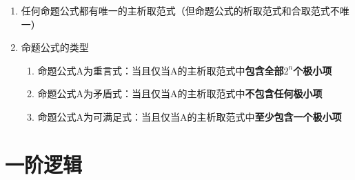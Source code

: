 \documentclass{ctexart}
\numberwithin{figure}{section}
\numberwithin{equation}{section}
\numberwithin{table}{section}
\begin{document}
\begin{enumerate}
                例如，对于两个命题变元 $p$ 和 $q$，其极大项共有 $2^2=4$ 个，分别为：
                \[
                \begin{aligned}
                M_0 &= p \lor q,\\
                M_1 &= p \lor \neg q,\\
                M_2 &= \neg p \lor q,\\
                M_3 &= \neg p \lor \neg q.
                \end{aligned}
                \]

                极大项的特点是：每一个极大项只在唯一一种真值赋值情况下为假，在其他赋值情况下均为真。例如：
                \[
                p \lor \neg q
                \]
                只有在 $p$ 为假、$q$ 为真时为假。
            \item 任何命题公式都有唯一的主析取范式（但命题公式的析取范式和合取范式不唯一）
            \item 命题公式的类型
                \begin{enumerate}
                    \item 命题公式A为重言式：当且仅当A的主析取范式中\textbf{包含全部$2^n$个极小项}
                    \item 命题公式A为矛盾式：当且仅当A的主析取范式中\textbf{不包含任何极小项}
                    \item 命题公式A为可满足式：当且仅当A的主析取范式中\textbf{至少包含一个极小项}
                \end{enumerate}
        \end{enumerate}
    \newpage
\section{一阶逻辑}
\end{document}
